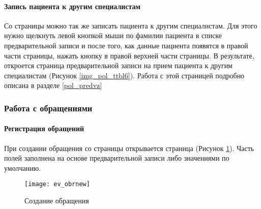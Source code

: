 \paragraph{Запись пациента к другим специалистам}

Со страницы  можно так же записать пациента к другим специалистам. Для этого нужно щелкнуть левой кнопкой мыши по фамилии пациента в списке предварительной записи и после того, как данные пациента появятся в правой части страницы, нажать кнопку  в правой верхней части страницы. В результате, откроется страница предварительной записи на прием пациента к другим специалистам (Рисунок \ref{img_pol_ttbl6}). Работа с этой страницей подробно описана в разделе \ref{pol_predvz}

\subsubsection{Работа с обращениями}
\paragraph{Регистрация обращений}

При создании обращения со страницы  открывается страница  (Рисунок \ref{img_ev_obrnew}). Часть полей заполнена на основе  предварительной записи либо значениями по умолчанию. 

\begin{figure}[ht]\centering
	\texttt{[image: ev\_obrnew]}
	\caption{Создание обращения}
	\label{img_ev_obrnew}
\end{figure}

